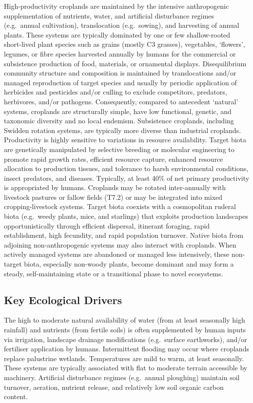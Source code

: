\documentclass[
  letterpaper,
  DIV=11,
  numbers=noendperiod]{scrartcl}
\begin{document}
High-productivity croplands are maintained by the intensive
anthropogenic supplementation of nutrients, water, and artificial
disturbance regimes (e.g.~annual cultivation), translocation
(e.g.~sowing), and harvesting of annual plants. These systems are
typically dominated by one or few shallow-rooted short-lived plant
species such as grains (mostly C3 grasses), vegetables, `flowers',
legumes, or fibre species harvested annually by humans for the
commercial or subsistence production of food, materials, or ornamental
displays. Disequilibrium community structure and composition is
maintained by translocations and/or managed reproduction of target
species and usually by periodic application of herbicides and pesticides
and/or culling to exclude competitors, predators, herbivores, and/or
pathogens. Consequently, compared to antecedent `natural' systems,
croplands are structurally simple, have low functional, genetic, and
taxonomic diversity and no local endemism. Subsistence croplands,
including Swidden rotation systems, are typically more diverse than
industrial croplands. Productivity is highly sensitive to variations in
resource availability. Target biota are genetically manipulated by
selective breeding or molecular engineering to promote rapid growth
rates, efficient resource capture, enhanced resource allocation to
production tissues, and tolerance to harsh environmental conditions,
insect predators, and diseases. Typically, at least 40\% of net primary
productivity is appropriated by humans. Croplands may be rotated
inter-annually with livestock pastures or fallow fields (T7.2) or may be
integrated into mixed cropping-livestock systems. Target biota coexists
with a cosmopolitan ruderal biota (e.g.~weedy plants, mice, and
starlings) that exploits production landscapes opportunistically through
efficient dispersal, itinerant foraging, rapid establishment, high
fecundity, and rapid population turnover. Native biota from adjoining
non-anthropogenic systems may also interact with croplands. When
actively managed systems are abandoned or managed less intensively,
these non-target biota, especially non-woody plants, become dominant and
may form a steady, self-maintaining state or a transitional phase to
novel ecosystems.

\subsection{Key Ecological Drivers}\label{key-ecological-drivers-98}

The high to moderate natural availability of water (from at least
seasonally high rainfall) and nutrients (from fertile soils) is often
supplemented by human inputs via irrigation, landscape drainage
modifications (e.g.~surface earthworks), and/or fertiliser application
by humans. Intermittent flooding may occur where croplands replace
palustrine wetlands. Temperatures are mild to warm, at least seasonally.
These systems are typically associated with flat to moderate terrain
accessible by machinery. Artificial disturbance regimes (e.g.~annual
ploughing) maintain soil turnover, aeration, nutrient release, and
relatively low soil organic carbon content.
\end{document}
